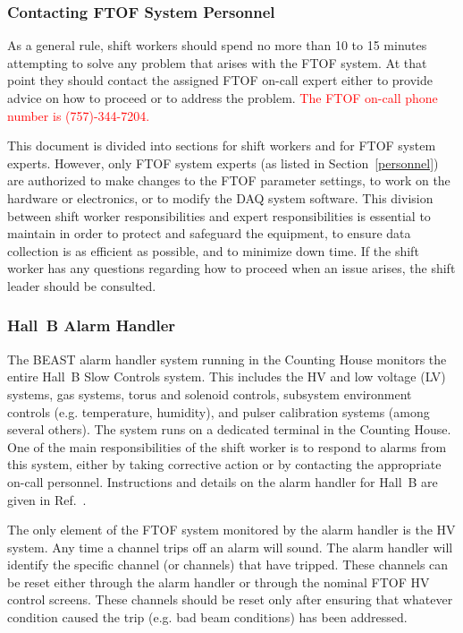 \documentclass[12pt]{article}
\begin{document}
\subsubsection{Contacting FTOF System Personnel}
\label{contact}

As a general rule, shift workers should spend no more than 10 to 15 minutes attempting to 
solve any problem that arises with the FTOF system. At that point they should contact the 
assigned FTOF on-call expert either to provide advice on how to proceed or to address the 
problem. \textcolor{red}{The FTOF on-call phone number is (757)-344-7204.}

This document is divided into sections for shift workers and for FTOF system experts. 
However, only FTOF system experts (as listed in Section~\ref{personnel}) are authorized 
to make changes to the FTOF parameter settings, to work on the hardware or electronics, 
or to modify the DAQ system software. This division between shift worker responsibilities 
and expert responsibilities is essential to maintain in order to protect and safeguard 
the equipment, to ensure data collection is as efficient as possible, and to minimize 
down time. If the shift worker has any questions regarding how to proceed when an issue 
arises, the shift leader should be consulted.

\subsubsection{Hall~B Alarm Handler}
\label{alarms}

The BEAST alarm handler system running in the Counting House monitors the entire 
Hall~B Slow Controls system. This includes the HV and low voltage (LV) systems, gas 
systems, torus and solenoid controls, subsystem environment controls (e.g. temperature, 
humidity), and pulser calibration systems (among several others). The system runs on a 
dedicated terminal in the Counting House. One of the main responsibilities of the shift 
worker is to respond to alarms from this system, either by taking corrective action or 
by contacting the appropriate on-call personnel. Instructions and details on the alarm 
handler for Hall~B are given in Ref.~\cite{beast}.

The only element of the FTOF system monitored by the alarm handler is the HV system. 
Any time a channel trips off an alarm will sound. The alarm handler will identify the 
specific channel (or channels) that have tripped. These channels can be reset either 
through the alarm handler or through the nominal FTOF HV control screens. These channels 
should be reset only after ensuring that whatever condition caused the trip (e.g. bad 
beam conditions) has been addressed.
\end{document}
